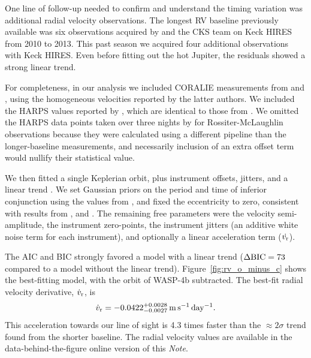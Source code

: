 \documentclass[12pt,twocolumn,tighten]{aastex62}
\begin{document}
One line of follow-up needed to confirm and understand the timing
variation was additional radial velocity observations.  The longest RV
baseline previously available was six observations acquired by
\citet{knutson_friends_2014} and the CKS team on Keck HIRES from
2010 to 2013.  This past season we acquired four additional
observations with Keck HIRES. Even before fitting out the hot Jupiter,
the residuals showed a strong linear trend.

For completeness, in our analysis we included CORALIE measurements
from \citet{wilson_wasp-4b_2008} and \citet{triaud_spin-orbit_2010},
using the homogeneous velocities reported by the latter authors.  We
included the HARPS values reported by \citet{pont_determining_2011},
which are identical to those from \citet{husnoo_observational_2012}.
We omitted the HARPS data points taken over three nights by
\citet{triaud_spin-orbit_2010} for Rossiter-McLaughlin observations
because they were calculated using a different pipeline than the
longer-baseline \citeauthor{pont_determining_2011} measurements, and
necessarily inclusion of an extra offset term would nullify their
statistical value.

We then fitted a single Keplerian orbit, plus instrument offsets,
jitters, and a linear trend
\citep[][\texttt{radvel}]{fulton_radvel_2018}.  We set Gaussian priors
on the period and time of inferior conjunction using the values from
\citet{bouma_wasp-4b_2019}, and fixed the eccentricity to zero,
consistent with results from \citet{beerer_secondary_2011},
\citet{knutson_friends_2014} and \citet{bonomo_gaps_2017}.  The
remaining free parameters were the velocity semi-amplitude, the
instrument zero-points, the instrument jitters (an additive white
noise term for each instrument), and optionally a linear acceleration
term ($\dot{v_{\rm r}}$).

The AIC and BIC strongly favored a model with a linear trend ($\Delta
{\rm BIC}=73$ compared to a model without the linear trend).
Figure~\ref{fig:rv_o_minus_c} shows the best-fitting model, with the
orbit of WASP-4b subtracted.  The best-fit radial velocity derivative,
$\dot{v}_{\rm r}$, is
\begin{equation}
  \dot{v}_{\rm r} = -0.0422^{+0.0028}_{-0.0027}\,{\rm m\,s^{-1}\,day^{-1}}.
\end{equation}
This acceleration towards our line of sight is 4.3 times faster than
the $\approx$$2\sigma$ trend \citet{knutson_friends_2014}
found from the shorter baseline.  The radial velocity values are
available in the data-behind-the-figure online version of this {\it
Note}.
\end{document}
